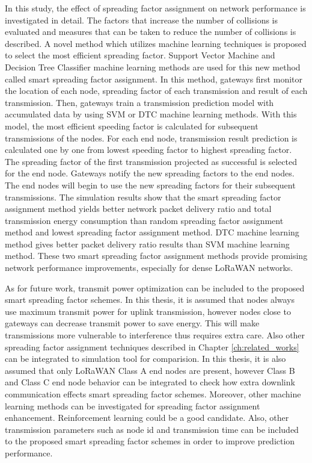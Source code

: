 In this study, the effect of spreading factor assignment on network performance is investigated in detail. The factors that increase the number of collisions is evaluated and measures that can be taken to reduce the number of collisions is described. A novel method which utilizes machine learning techniques is proposed to select the most efficient spreading factor. Support Vector Machine and Decision Tree Classifier machine learning methods are used for this new method called smart spreading factor assignment. In this method, gateways first monitor the location of each node, spreading factor of each transmission and result of each transmission. Then, gateways train a transmission prediction model with accumulated data by using SVM or DTC machine learning methods. With this model, the most efficient speeding factor is calculated for subsequent transmissions of the nodes. For each end node, transmission result prediction is calculated one by one from lowest speeding factor to highest spreading factor. The spreading factor of the first transmission projected as successful is selected for the end node. Gateways notify the new spreading factors to the end nodes. The end nodes will begin to use the new spreading factors for their subsequent transmissions. The simulation results show that the smart spreading factor assignment method yields better network packet delivery ratio and total transmission energy consumption than random spreading factor assignment method and lowest spreading factor assignment method. DTC machine learning method gives better packet delivery ratio results than SVM machine learning method. These two smart spreading factor assignment methods provide promising network performance improvements, especially for dense LoRaWAN networks.

As for future work, transmit power optimization can be included to the proposed smart spreading factor schemes. In this thesis, it is assumed that nodes always use maximum transmit power for uplink transmission, however nodes close to gateways can decrease transmit power to save energy. This will make transmissions more vulnerable to interference thus requires extra care. Also other spreading factor assignment techniques described in Chapter \ref{ch:related_works} can be integrated to simulation tool for comparision. In this thesis, it is also assumed that only LoRaWAN Class A end nodes are present, however Class B and Class C end node behavior can be integrated to check how extra downlink communication effects smart spreading factor schemes. Moreover, other machine learning methods can be investigated for spreading factor assignment enhancement. Reinforcement learning could be a good candidate. Also, other transmission parameters such as node id and transmission time can be included to the proposed smart spreading factor schemes in order to improve prediction performance.
